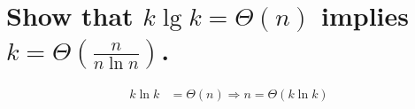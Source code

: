 \section[Problem 3]{Show that $k \lg k = \Theta(n)$ implies $k = \Theta\left(\frac{n}{n \ln n}\right)$.}
\begin{align}
	k \ln k &= \Theta(n) \Rightarrow n = \Theta(k \ln k) \\
\end{align}
